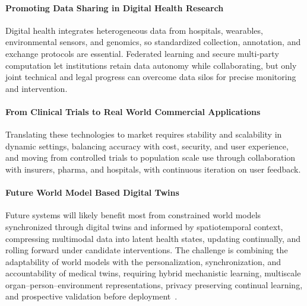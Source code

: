 \documentclass[journal]{IEEEtran}
\begin{document}
\paragraph{Promoting Data Sharing in Digital Health Research}
Digital health integrates heterogeneous data from hospitals, wearables, environmental sensors, and genomics, so standardized collection, annotation, and exchange protocols are essential. Federated learning and secure multi-party computation let institutions retain data autonomy while collaborating, but only joint technical and legal progress can overcome data silos for precise monitoring and intervention.

\paragraph{From Clinical Trials to Real World Commercial Applications}
Translating these technologies to market requires stability and scalability in dynamic settings, balancing accuracy with cost, security, and user experience, and moving from controlled trials to population scale use through collaboration with insurers, pharma, and hospitals, with continuous iteration on user feedback.

\paragraph{Future World Model Based Digital Twins}
Future systems will likely benefit most from constrained world models synchronized through digital twins and informed by spatiotemporal context, compressing multimodal data into latent health states, updating continually, and rolling forward under candidate interventions. The challenge is combining the adaptability of world models with the personalization, synchronization, and accountability of medical twins, requiring hybrid mechanistic learning, multiscale organ--person--environment representations, privacy preserving continual learning, and prospective validation before deployment~\cite{DeDomenico2025ComplexSystems}.
\fi
\end{document}
